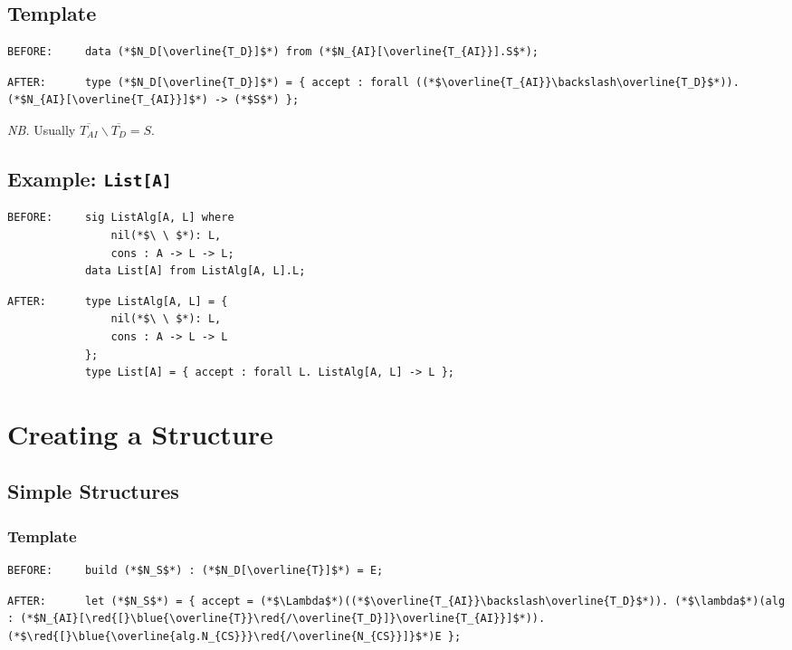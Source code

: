 \documentclass{article}
\newcommand{\red}[1]{\textcolor{red}{#1}}
\newcommand{\blue}[1]{\textcolor{blue}{#1}}
\newcommand{\nb}{\textit{NB. }}
\begin{document}
\begin{spacing}{1.1}
\subsection{Template}

\begin{lstlisting}[numbers=none]
BEFORE:     data (*$N_D[\overline{T_D}]$*) from (*$N_{AI}[\overline{T_{AI}}].S$*);
\end{lstlisting}
\begin{lstlisting}[numbers=none]
AFTER:      type (*$N_D[\overline{T_D}]$*) = { accept : forall ((*$\overline{T_{AI}}\backslash\overline{T_D}$*)). (*$N_{AI}[\overline{T_{AI}}]$*) -> (*$S$*) };
\end{lstlisting}

\nb Usually $\overline{T_{AI}}\backslash\overline{T_D}=S$.

\subsection{Example: \lstinline{List[A]}}

\begin{lstlisting}[numbers=none]
BEFORE:     sig ListAlg[A, L] where
                nil(*$\ \ $*): L,
                cons : A -> L -> L;
            data List[A] from ListAlg[A, L].L;
\end{lstlisting}
\begin{lstlisting}[numbers=none]
AFTER:      type ListAlg[A, L] = {
                nil(*$\ \ $*): L,
                cons : A -> L -> L
            };
            type List[A] = { accept : forall L. ListAlg[A, L] -> L };
\end{lstlisting}

\section{Creating a Structure}

\subsection{Simple Structures}

\subsubsection{Template}

\begin{lstlisting}[numbers=none]
BEFORE:     build (*$N_S$*) : (*$N_D[\overline{T}]$*) = E;
\end{lstlisting}
\begin{lstlisting}[numbers=none]
AFTER:      let (*$N_S$*) = { accept = (*$\Lambda$*)((*$\overline{T_{AI}}\backslash\overline{T_D}$*)). (*$\lambda$*)(alg : (*$N_{AI}[\red{[}\blue{\overline{T}}\red{/\overline{T_D}]}\overline{T_{AI}}]$*)). (*$\red{[}\blue{\overline{alg.N_{CS}}}\red{/\overline{N_{CS}}]}$*)E };
\end{lstlisting}


\end{spacing}
\end{document}
